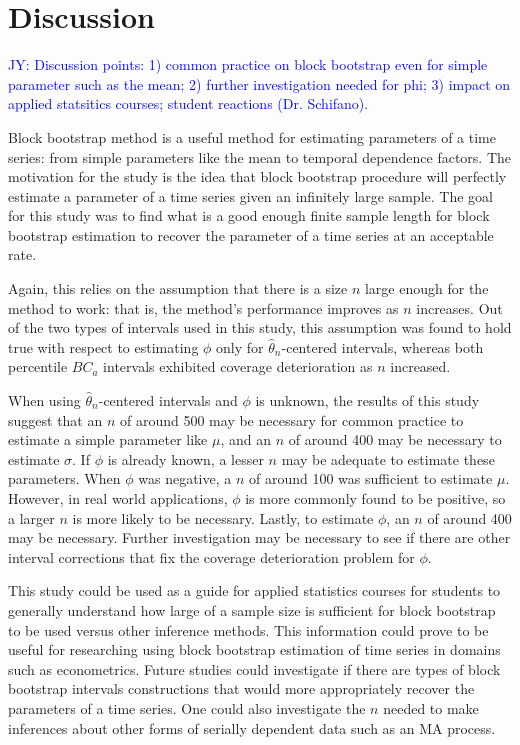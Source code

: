 \documentclass[12pt, letterpaper, titlepage]{article}
\newcommand{\jy}[1]{\textcolor{blue}{JY: #1}}
\begin{document}
\section{Discussion}
\label{sec:disc}

\jy{Discussion points:
  1) common practice on block bootstrap even for simple parameter such as the
  mean;
  2) further investigation needed for phi;
  3) impact on applied statsitics courses; student reactions (Dr. Schifano).
}


Block bootstrap method is a useful method for estimating parameters of a time
series: from simple parameters like the mean to temporal dependence factors.
The motivation for the study is the idea that block bootstrap procedure will
perfectly estimate a parameter of a time series given an infinitely large
sample. The goal for this study was to find what is a good enough finite
sample length for block bootstrap estimation to recover the parameter of a
time series at an acceptable rate.


Again, this relies on the assumption that
there is a size $n$ large enough for the method to work: that is, the method's
performance improves as $n$ increases. Out of the two types of intervals used
in this study, this assumption was found to hold true with respect to
estimating $\phi$ only for $\hat{\theta}_{n}$-centered intervals, whereas both
percentile $BC_a$ intervals exhibited coverage deterioration as $n$
increased.


When using $\hat{\theta}_{n}$-centered intervals and $\phi$ is
unknown, the results of this study suggest that an $n$ of around 500 may be
necessary for common practice to estimate a simple parameter like $\mu$, and
an $n$ of around 400 may be necessary to
estimate $\sigma$. If $\phi$ is already known, a lesser $n$ may be adequate to
estimate these parameters. When $\phi$ was negative, a $n$ of around 100 was
sufficient to estimate $\mu$. However, in real world applications, $\phi$ is
more commonly found to be positive, so a larger $n$ is more likely to be
necessary. Lastly, to estimate $\phi$, an $n$ of around 400 may be necessary.
Further investigation may be necessary to see if there are other interval
corrections that fix the coverage deterioration problem for $\phi$.


This study could be used as a guide for applied statistics courses for students
to generally understand how large of a sample size is sufficient for block
bootstrap to be used versus other inference methods.
This information could prove to be useful for researching using block bootstrap
estimation of time series in domains such as econometrics. Future studies
could investigate if there are types of block bootstrap intervals
constructions that would more appropriately recover the parameters of a time
series. One could also investigate the $n$ needed to make inferences about
other forms of serially dependent data such as an MA process.




\end{document}
